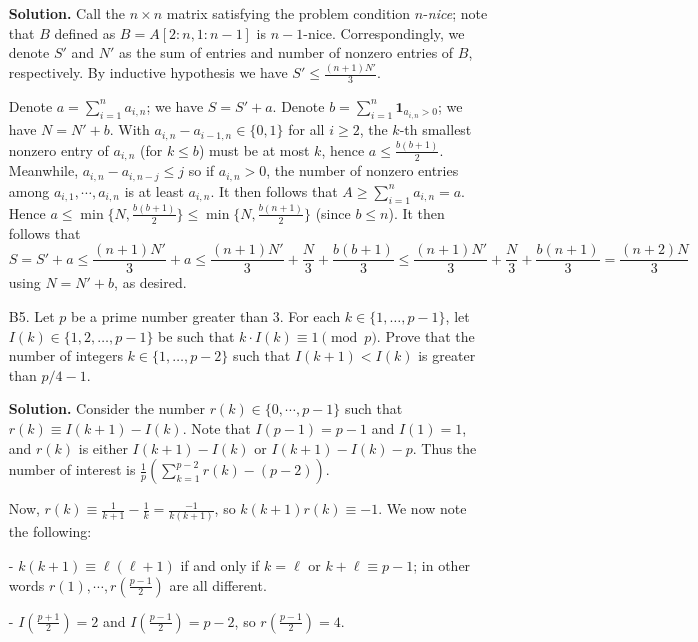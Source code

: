 \documentclass[11pt,a4paper]{article}
\begin{document}
\begin{enumerate}
        \textbf{Solution.} 
        Call the $n\times n$ matrix satisfying the problem condition $n$-\textit{nice}; 
        note that $B$ defined as $B=A[2:n, 1:n-1]$ is $n-1$-nice. 
        Correspondingly, we denote $S'$ and $N'$ as the sum of entries and number of nonzero entries of $B$, respectively. 
        By inductive hypothesis we have $S'\le \frac{(n+1)N'}{3}$. 
        
        Denote $a = \sum_{i=1}^n a_{i, n}$; we have $S=S'+a$. 
        Denote $b = \sum_{i=1}^n \boldsymbol{1}_{a_{i, n} > 0}$; we have $N=N'+b$. 
        With $a_{i, n}-a_{i-1, n}\in \{0, 1\}$ for all $i\ge 2$, the $k$-th smallest nonzero entry of $a_{i, n}$ (for $k\le b$) must be at most $k$, 
        hence $a\le \frac{b(b+1)}{2}$. 
        Meanwhile, $a_{i, n} - a_{i, n - j}\le j$ so if $a_{i, n} > 0$, 
        the number of nonzero entries among $a_{i, 1}, \cdots, a_{i, n}$ is at least $a_{i, n}$. 
        It then follows that $A\ge \sum_{i=1}^n a_{i, n} = a$. 
        Hence $a\le \min \{N, \frac{b(b+1)}{2}\}\le \min \{N, \frac{b(n+1)}{2}\}$ 
        (since $b\le n$). 
        It then follows that 
        \[
        S = S' + a \le \frac{(n+1)N'}{3} + a
        \le \frac{(n+1)N'}{3}  + \frac{N}{3} + \frac{b(b+1)}{3}
        \le \frac{(n+1)N'}{3}  + \frac{N}{3} + \frac{b(n+1)}{3}
        =\frac{(n+2)N}{3} 
        \]
        using $N=N'+b$, as desired. 
        
        \item [B5.]
        Let $p$ be a prime number greater than $3$. For each $k \in \{1,\dots,p-1\}$, let $I(k) \in \{1,2,\dots,p-1\}$ be such that $k \cdot I(k) \equiv 1 \pmod{p}$. Prove that the number of integers $k \in \{1,\dots,p-2\}$ such that $I(k+1)<I(k)$ is greater than $p/4-1$.
        
        \textbf{Solution.}
        Consider the number $r(k)\in \{0, \cdots, p-1\}$ such that $r(k)\equiv I(k+1)-I(k)$. Note that $I(p-1)=p-1$ and $I(1)=1$, and $r(k)$ is either $I(k+1)-I(k)$ or $I(k+1)-I(k)-p$. Thus the number of interest is $\frac{1}{p}\left(\sum_{k=1}^{p-2} r(k)-(p-2)\right)$.
        
        Now, $r(k)\equiv \frac{1}{k+1}-\frac{1}{k}=\frac{-1}{k(k+1)}$, so $k(k+1)r(k)\equiv -1$. We now note the following:
        
        - $k(k+1)\equiv \ell(\ell+1)$ if and only if $k=\ell$ or $k+\ell\equiv p-1$; in other words $r(1), \cdots, r(\frac{p-1}{2})$ are all different.
        
        - $I(\frac{p+1}{2})=2$ and $I(\frac{p-1}{2})=p-2$, so $r(\frac{p-1}{2})=4$.
        

\end{enumerate}
\end{document}
